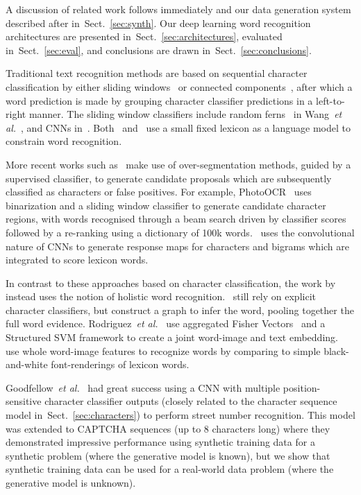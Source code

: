 \documentclass{article} \usepackage{nips14submit_e,times}
\newcommand{\sref}[1]{Sect.~\ref{#1}}
\def\etal{\emph{et al.}}
\renewcommand{\paragraph}[1]{\par\noindent{\bf #1}}
\begin{document}
A discussion of related work follows immediately and our data generation system described after in~\sref{sec:synth}. Our deep learning word recognition architectures are presented in~\sref{sec:architectures}, evaluated in~\sref{sec:eval}, and conclusions are drawn in~\sref{sec:conclusions}.

\paragraph{Related work.}\label{sec:related}
Traditional text recognition methods are based on sequential character
classification by either sliding
windows~\cite{Wang11,Wang12,Jaderberg14a} or connected
components~\cite{Neumann10a,Neumann12}, after which a word
prediction is made by grouping character classifier predictions in a
left-to-right manner. The sliding window classifiers include random
ferns~\cite{Ozuysal07} in Wang~\etal~\cite{Wang11}, and CNNs in~\cite{Wang12,Jaderberg14a}. Both~\cite{Wang11} and~\cite{Wang12} use a
small fixed lexicon as a language model to constrain word recognition.

More recent works such as~\cite{Bissacco13,Neumann13,Alsharif13} make
use of over-segmentation methods, guided by a supervised classifier, to
generate candidate proposals which are subsequently classified as
characters or false positives. For example, PhotoOCR~\cite{Bissacco13} uses binarization and a sliding window classifier to generate candidate character regions, with words recognised through a beam search driven by classifier scores followed by a re-ranking using a dictionary of 100k words.~\cite{Jaderberg14a} uses the convolutional nature of CNNs to generate response maps for characters and bigrams which are integrated to score lexicon words.



In contrast to these approaches based on character
classification, the work
by~\cite{Goel13,Rodriguez13,Novikova12,Mishra12} instead uses the
notion of holistic word recognition.~\cite{Mishra12,Novikova12} still
rely on explicit character classifiers, but construct a graph to infer
the word, pooling together the full word
evidence. Rodriguez~\etal~\cite{Rodriguez13} use aggregated Fisher
Vectors~\cite{Perronnin10} and a Structured SVM
framework to create a joint word-image and text
embedding.~\cite{Goel13} use whole word-image features to recognize
words by comparing to simple black-and-white font-renderings of
lexicon words.

Goodfellow~\etal~\cite{Goodfellow13} had great success using a CNN with multiple position-sensitive character classifier outputs (closely related to the character sequence model in~\sref{sec:characters}) to perform street number recognition. This model was extended to CAPTCHA sequences (up to 8 characters long) where they demonstrated impressive performance using synthetic training data for a synthetic problem (where the generative model is known), but we show that synthetic training data can be used for a real-world data problem (where the generative model is unknown).
\end{document}
